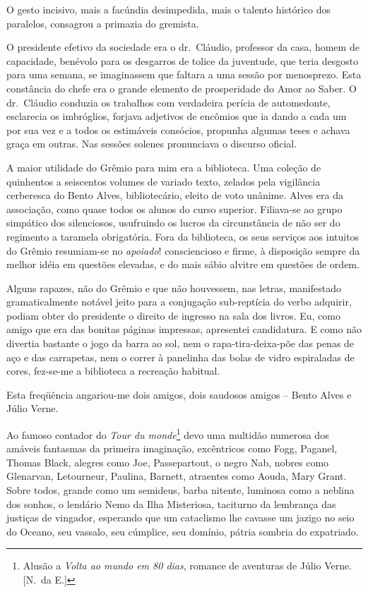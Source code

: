 
O gesto incisivo,
mais a facúndia desimpedida, mais o talento histórico dos paralelos,
consagrou a primazia do gremista. 

O presidente efetivo da sociedade era
o dr.~Cláudio, professor da casa, homem de capacidade, benévolo para os
desgarros de tolice da juventude, que teria desgosto para uma semana,
se imaginassem que faltara a uma sessão por menosprezo. Esta constância
do chefe era o grande elemento de prosperidade do Amor ao Saber. 
O dr.~Cláudio conduzia os trabalhos com verdadeira perícia de automedonte,
esclarecia os imbróglios, forjava adjetivos de encômios que ia dando a
cada um por sua vez e a todos os estimáveis consócios, propunha algumas
teses e achava graça em outras. Nas sessões solenes pronunciava o
discurso oficial. 

A maior utilidade do Grêmio para mim era a
biblioteca. Uma coleção de quinhentos a seiscentos volumes de variado
texto, zelados pela vigilância cerberesca do Bento Alves,
bibliotecário, eleito de voto unânime. Alves era da associação, como
quase todos os alunos do curso superior. Filiava{}-se ao grupo
simpático dos silenciosos, usufruindo os lucros da circunstância de não
ser do regimento a taramela obrigatória. Fora da biblioteca, os seus
serviços aos intuitos do Grêmio resumiam{}-se no \textit{apoiado}! consciencioso
e firme, à disposição sempre da melhor idéia em questões elevadas, e do
mais sábio alvitre em questões de ordem. 

Alguns rapazes, não do Grêmio
e que não houvessem, nas letras, manifestado gramaticalmente notável
jeito para a conjugação sub{}-reptícia do verbo adquirir, podiam obter
do presidente o direito de ingresso na sala dos livros. Eu, como amigo
que era das bonitas páginas impressas, apresentei candidatura. E como
não divertia bastante o jogo da barra ao sol, nem o
rapa{}-tira{}-deixa{}-põe das penas de aço e das carrapetas, nem o
correr à panelinha das bolas de vidro espiraladas de cores, fez{}-se{}-me
a biblioteca a recreação habitual. 

Esta freqüência angariou{}-me dois
amigos, dois saudosos amigos -- Bento Alves e Júlio Verne. 

Ao famoso contador do \textit{Tour du monde}\footnote{ Alusão a \textit{Volta ao mundo em 80 dias}, 
romance de aventuras de Júlio Verne. [N.~da E.]} devo uma multidão numerosa dos amáveis
fantasmas da primeira imaginação, excêntricos como Fogg, Paganel,
Thomas Black, alegres como Joe, Passepartout, o negro Nab, nobres como
Glenarvan, Letourneur, Paulina, Barnett, atraentes como Aouda, Mary
Grant. Sobre todos, grande como um semideus, barba nitente, luminosa
como a neblina dos sonhos, o lendário Nemo da Ilha Misteriosa,
taciturno da lembrança das justiças de vingador, esperando que um
cataclismo lhe cavasse um jazigo no seio do Oceano, seu vassalo, seu
cúmplice, seu domínio, pátria sombria do expatriado.

